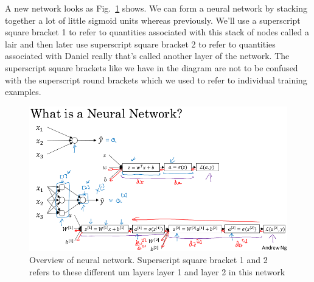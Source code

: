 \documentclass[a4paper]{article}
\begin{document}
A new network looks as Fig.~\ref{p11} shows. We can form a neural network by stacking together a lot of little sigmoid units whereas previously. We'll use a superscript square bracket 1 to refer to quantities associated with this stack of nodes called a lair and then later use superscript square bracket 2 to refer to quantities associated with Daniel really that's called another layer of the network. The superscript square brackets like we have in the diagram are not to be confused with the superscript round brackets which we used to refer to individual training examples.
\begin{figure}
	\begin{center}
		\includegraphics[scale=0.4]{figures/12.png}
	\end{center}
	\caption{Overview of neural network. Superscript square bracket 1 and 2 refers to these different um layers layer 1 and layer 2 in this network}
	\label{p11}
\end{figure}
\end{document}

